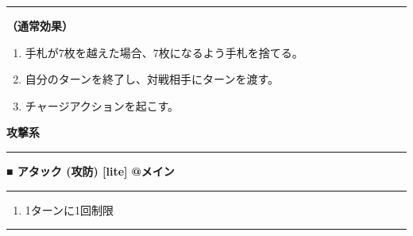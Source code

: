\documentclass[twocolumn,a5paper,papersize,10pt]{jarticle}
\begin{document}
\vspace{1mm}%
\hrule height 0.1mm depth 0mm width 66.5mm %
\vspace{1mm}%

{\bf（通常効果）}


\vspace{-1zh}%
\begin{enumerate}
\setlength{\leftskip}{-0.3cm}
\setlength{\parskip}{0pt} %

\item 手札が7枚を越えた場合、7枚になるよう手札を捨てる。

\item 自分のターンを終了し、対戦相手にターンを渡す。

\item チャージアクションを起こす。
\vspace{-1zh}%
\end{enumerate}


\begin{tcolorbox}
{\scriptsize\bf 攻撃系}
\end{tcolorbox}
\vspace{-1zh}%
\vspace{2mm} %
\hrule height 0.5mm depth 0mm width 66.5mm %
\vspace{1mm} %
{\normalsize\bf ■ アタック {\scriptsize (攻防) [lite]}} %
\hfill 
{\small\bf @メイン }


\vspace{1mm}%
\hrule height 0.1mm depth 0mm width 66.5mm %
\vspace{1mm}%


\vspace{-1zh}%
\begin{enumerate}
\renewcommand{\labelenumi}{※}
\setlength{\leftskip}{-0.3cm}
\setlength{\itemsep}{0pt} %
\setlength{\parskip}{0pt} %

\item 1ターンに1回制限

\vspace{-3mm}%
\end{enumerate}
\vspace{1mm}%
\hrule height 0.1mm depth 0mm width 66.5mm %
\vspace{1mm}%
\end{document}
